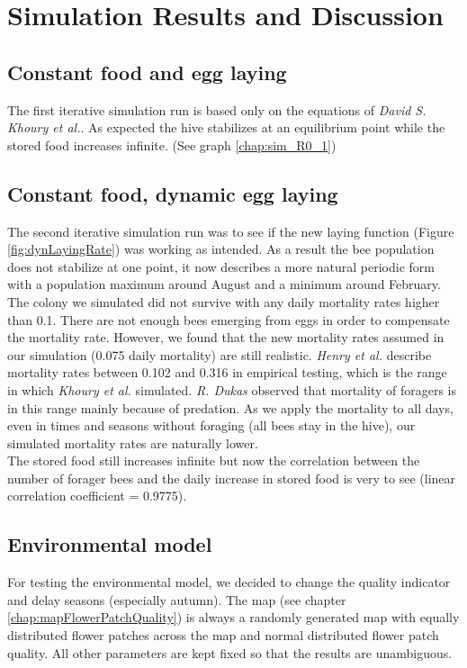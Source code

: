 \section{Simulation Results and Discussion}

\subsection{Constant food and egg laying}
	\label{chap:constantFoodConstantLaying}
	The first iterative simulation run is based only on the equations of \textit{David S. Khoury et al.}\cite{khoury13}. As expected the hive stabilizes at an equilibrium point while the stored food increases infinite. (See graph \ref{chap:sim_R0_1})

\subsection{Constant food, dynamic egg laying}
	\label{chap:constantFoodDynamicLaying}
	The second iterative simulation run was to see if the new laying function (Figure \ref{fig:dynLayingRate})  was working as intended. As a result the bee population does not stabilize at one point, it now describes a more natural periodic form with a population maximum around August and a minimum around February.\\
	
	The colony we simulated did not survive with any daily mortality rates higher than 0.1. There are not enough bees emerging from eggs in order to compensate the mortality rate. However, we found that the new mortality rates assumed in our simulation (0.075 daily mortality) are still realistic. \textit{Henry et al.} \cite{henry12} describe mortality rates between 0.102 and 0.316 in empirical testing, which is the range in which \textit{Khoury et al.} \cite{khoury13} simulated. \textit{R. Dukas} \cite{dukas08} observed that mortality of foragers is in this range mainly because of predation. As we apply the mortality to all days, even in times and seasons without foraging (all bees stay in the hive), our simulated mortality rates are naturally lower.\\
	
	The stored food still increases infinite but now the correlation between the number of forager bees and the daily increase in stored food is very to see (linear correlation coefficient =  0.9775).

\subsection{Environmental model}
	\label{chap:environmentalModelDiscussion}
	For testing the environmental model, we decided to change the quality indicator and delay seasons (especially autumn). The map (see chapter \ref{chap:mapFlowerPatchQuality}) is always a randomly generated map with equally distributed flower patches across the map and normal distributed flower patch quality. All other parameters are kept fixed so that the results are unambiguous.
